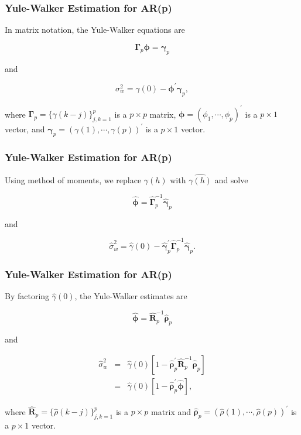 \documentclass[%
xcolor=pdftex]{beamer}
\begin{document}
\begin{frame}
\frametitle{Yule-Walker Estimation for AR(p)}

In matrix notation, the Yule-Walker equations are

\begin{equation*}
\boldsymbol{\Gamma}_p \boldsymbol{\phi} = \boldsymbol{\gamma}_p
\end{equation*}

and

\begin{equation*}
\sigma_w^2 = \gamma(0) - \boldsymbol{\phi^{\prime}\gamma}_p,
\end{equation*}

where $\boldsymbol{\Gamma}_p = \{\gamma(k-j) \}_{j,k=1}^p$ is a $p \times p$ matrix, $\boldsymbol{\phi} = (\phi_1, \cdots, \phi_p)^{\prime}$ is a $p \times 1$ vector, and $\boldsymbol{\gamma}_p = (\gamma(1), \cdots, \gamma(p))^{\prime}$ is a $p \times 1$ vector.

\end{frame}

\begin{frame}
\frametitle{Yule-Walker Estimation for AR(p)}

Using method of moments, we replace $\gamma(h)$ with $\hat{\gamma(h)}$ and solve

\begin{equation*}
\boldsymbol{\hat{\phi}} = \hat{\boldsymbol{\Gamma}}_p^{-1} \hat{\boldsymbol{\gamma}}_p
\end{equation*}

and

\begin{equation*}
\hat{\sigma}_w^2 = \hat{\gamma}(0) - \hat{\boldsymbol{\gamma}}_p^{\prime} \hat{\boldsymbol{\Gamma}}_p^{-1} \hat{\boldsymbol{\gamma}}_p.
\end{equation*}

\end{frame}

\begin{frame}
\frametitle{Yule-Walker Estimation for AR(p)}

By factoring $\hat{\gamma}(0)$, the Yule-Walker estimates are

\begin{equation} \label{eq:s1}
\boldsymbol{\hat{\phi}} = \hat{\bm{R}}_p^{-1} \hat{\boldsymbol{\rho}}_p
\end{equation}

and

\begin{eqnarray} \label{eq:s2}
\hat{\sigma}_w^2 &=& \hat{\gamma}(0) \left[ 1 - \hat{\boldsymbol{\rho}}_p^{\prime} \hat{\bm{R}}_p^{-1} \hat{\boldsymbol{\rho}}_p \right] \nonumber \\
                 &=& \hat{\gamma}(0) \left[ 1 - \hat{\boldsymbol{\rho}}_p^{\prime} \boldsymbol{\hat{\phi}} \right],
\end{eqnarray}

where $\bm{\hat{R}}_p = \{\hat{\rho}(k-j) \}_{j,k=1}^p$ is a $p \times p$ matrix and $\boldsymbol{\hat{\rho}}_p = (\hat{\rho}(1), \cdots, \hat{\rho}(p))^{\prime}$ is a $p \times 1$ vector.

\end{frame}
\end{document}

